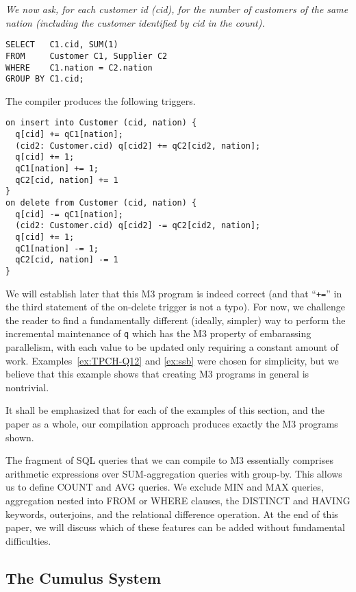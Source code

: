 \begin{example}\em
\label{ex:self-join}
We now ask, for each customer id (cid),
for the number of customers of the same nation (including the customer
identified by cid in the count).
\begin{verbatim}
SELECT   C1.cid, SUM(1)
FROM     Customer C1, Supplier C2
WHERE    C1.nation = C2.nation
GROUP BY C1.cid;
\end{verbatim}
The compiler produces the following triggers.
\begin{verbatim}
on insert into Customer (cid, nation) {
  q[cid] += qC1[nation];
  (cid2: Customer.cid) q[cid2] += qC2[cid2, nation];
  q[cid] += 1;
  qC1[nation] += 1;
  qC2[cid, nation] += 1
}
on delete from Customer (cid, nation) {
  q[cid] -= qC1[nation];
  (cid2: Customer.cid) q[cid2] -= qC2[cid2, nation];
  q[cid] += 1;
  qC1[nation] -= 1;
  qC2[cid, nation] -= 1
}
\end{verbatim}
We will establish later that this M3 program is indeed correct
(and that ``{\tt +=}'' in the third statement of the on-delete trigger
is not a typo).
For now, we challenge the reader to find a 
fundamentally different (ideally, simpler) way to
perform the incremental maintenance of {\tt q}
which has the M3 property of embarassing parallelism, with each value
to be updated only requiring a constant amount of work.
Examples~\ref{ex:TPCH-Q12} and \ref{ex:ssb} were chosen for simplicity,
but we believe that this example shows that creating M3 programs in general
is nontrivial.
\punto
\end{example}


It shall be emphasized that for each of the examples of this section,
and the paper as a whole, our compilation approach produces exactly
the M3 programs shown.


The fragment of SQL queries that we can compile to M3 essentially comprises
arithmetic expressions over SUM-agg\-regation queries with group-by.
This allows us to define COUNT and AVG queries.
We exclude MIN and MAX queries, aggregation
nested into FROM or WHERE clauses, the DISTINCT and HAVING keywords,
outerjoins,
and the relational difference operation. At the end of this paper, we will
discuss which of these features can be added without fundamental difficulties.


\subsection{The Cumulus System}


